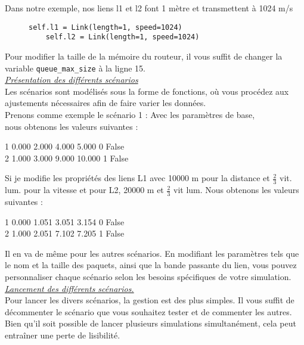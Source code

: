 \documentclass[a4paper, 12pt]{report}
\begin{document}
Dans notre exemple, nos liens l1 et l2 font 1 mètre et transmettent à 1024 m/s
	\begin{figure}[h]
	\centering
	\begin{minipage}{.8\textwidth}
	\begin{lstlisting}[caption={Variables pour les liens}, basicstyle=\ttfamily]
	self.l1 = Link(length=1, speed=1024)
	self.l2 = Link(length=1, speed=1024)
	\end{lstlisting}
	\end{minipage}
	\end{figure}

Pour modifier la taille de la mémoire du routeur, il vous suffit de changer la variable \texttt{queue\_max\_size} à la ligne 15.\\

\textit{\underline{Présentation des différents scénarios}}\\

Les scénarios sont  modélisés sous la forme de fonctions, où vous procédez aux ajustements nécessaires afin de faire varier les données.\\ 

Prenons comme exemple le scénario 1  :
Avec les paramètres de base,\\nous obtenons les valeurs suivantes :
\begin{center}
1 0.000 2.000 4.000 5.000 0 False\\
2 1.000 3.000 9.000 10.000 1 False
\end{center}

Si je modifie les propriétés des liens L1 avec 10000 m pour la distance et $\frac{2}{3}$ vit. lum. pour la vitesse et pour L2, 20000 m et $\frac{2}{3}$ vit lum. Nous obtenons les valeurs suivantes :
\begin{center}
1 0.000 1.051 3.051 3.154 0 False\\
2 1.000 2.051 7.102 7.205 1 False
\end{center}

Il en va de même pour les autres scénarios. En modifiant les paramètres tels que le nom et la taille des paquets, ainsi que la bande passante du lien, vous pouvez personnaliser chaque scénario selon les besoins spécifiques de votre simulation.\\


\textit{\underline{Lancement des différents scénarios.}}\\

Pour lancer les divers scénarios, la gestion est des plus simples. Il vous suffit de décommenter le scénario que vous souhaitez tester et de commenter les autres. Bien qu'il soit possible de lancer plusieurs simulations simultanément, cela peut entraîner une perte de lisibilité. \\
\end{document}
